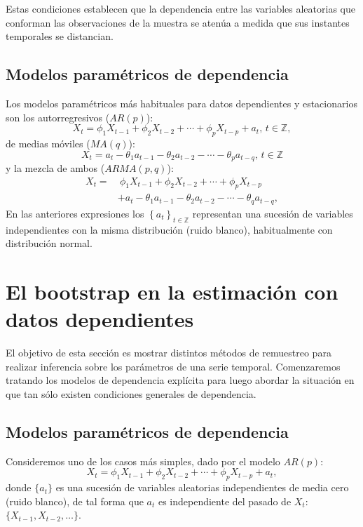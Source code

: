 \documentclass[
]{book}
\theoremstyle{break}
\theoremstyle{nonumberplain}
\begin{document}
Estas condiciones establecen que la dependencia entre las variables
aleatorias que conforman las observaciones de la muestra se atenúa a
medida que sus instantes temporales se distancian.

\subsection{Modelos paramétricos de dependencia}\label{modelos-paramuxe9tricos-de-dependencia}

Los modelos paramétricos más habituales para datos dependientes y
estacionarios son los autorregresivos (\(AR\left( p \right)\)):
\[X_{t}=\phi _1X_{t-1}+\phi _2X_{t-2}+\cdots +\phi _{p}X_{t-p}+a_{t}
\text{, }t\in \mathbb{Z},\]
de medias móviles (\(MA\left( q \right)\)):
\[X_{t}=a_{t}-\theta _1a_{t-1}-\theta _2a_{t-2}-\cdots -\theta _{p}a_{t-q}
\text{, }t\in \mathbb{Z}\]
y la mezcla de ambos (\(ARMA\left( p,q \right)\)):
\[\begin{aligned}
X_{t} =&\ \phi _1X_{t-1}+\phi _2X_{t-2}+\cdots +\phi _{p}X_{t-p} \\
&+a_{t}-\theta _1a_{t-1}-\theta _2a_{t-2}-\cdots -\theta _{q}a_{t-q},\end{aligned}\]
En las anteriores expresiones los
\(\left\{ a_{t}\right\} _{t\in \mathbb{Z}}\) representan una sucesión de
variables independientes con la misma distribución (ruido blanco),
habitualmente con distribución normal.

\section{El bootstrap en la estimación con datos dependientes}\label{el-bootstrap-en-la-estimaciuxf3n-con-datos-dependientes}

El objetivo de esta sección es mostrar distintos métodos de remuestreo
para realizar inferencia sobre los parámetros de una serie temporal.
Comenzaremos tratando los modelos de dependencia explícita para luego
abordar la situación en que tan sólo existen condiciones generales de
dependencia.

\subsection{Modelos paramétricos de dependencia}\label{modelos-paramuxe9tricos-de-dependencia-1}

Consideremos uno de los casos más simples, dado por el modelo \(AR(p)\):
\[X_{t}=\phi _1X_{t-1}+\phi _2X_{t-2}+\cdots +\phi _{p}X_{t-p}+a_{t},\]donde
\(\{a_{t}\}\) es una sucesión de variables aleatorias independientes de
media cero (ruido blanco), de tal forma que \(a_{t}\) es independiente del
pasado de \(X_{t}\): \(\{X_{t-1},X_{t-2},\ldots \}\).
\end{document}
